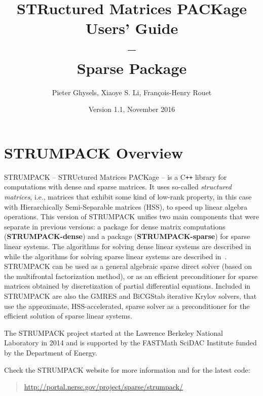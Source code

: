 \documentclass{article}
\title{\vspace{-3\baselineskip}STRuctured Matrices PACKage Users' Guide\\
--\\
Sparse Package}
\author{Pieter Ghysels\footnotemark[1] , Xiaoye S. Li\footnotemark[1] , Fran\c{c}ois-Henry Rouet\footnotemark[1]}
\date{Version 1.1, November 2016}
\begin{document}
\maketitle

\vfill

\tableofcontents


\pagebreak
\section{STRUMPACK Overview}
STRUMPACK -- STRUctured Matrices PACKage -- is a C\texttt{++} library
for computations with dense and sparse matrices. It uses so-called
\emph{structured matrices}, i.e., matrices that exhibit some kind of
low-rank property, in this case with Hierarchically Semi-Separable
matrices (HSS), to speed up linear algebra operations. 
This version of STRUMPACK unifies two main components that were separate in previous versions:
a package for dense matrix computations
(\textbf{STRUMPACK-dense}) and a package (\textbf{STRUMPACK-sparse})
for sparse linear systems. The algorithms for solving dense linear systems are described 
in~\cite{rouet2014distributed} while the algorithms for solving sparse linear systems are described
in~\cite{ghysels2015sparse,ghysels2017sparse}. STRUMPACK can be used as a general
algebraic sparse direct solver (based on the multifrontal
factorization method), or as an efficient preconditioner for sparse
matrices obtained by discretization of partial differential
equations. Included in STRUMPACK are also the GMRES
and BiCGStab iterative Krylov solvers, that use the approximate,
HSS-accelerated, sparse solver as a preconditioner for the efficient
solution of sparse linear systems.

The STRUMPACK project started at the Lawrence Berkeley National
Laboratory in 2014 and is supported by the FASTMath SciDAC Institute
funded by the Department of Energy.

\noindent Check the STRUMPACK website for more information and for the
latest code:
\begin{quote}
  \url{http://portal.nersc.gov/project/sparse/strumpack/}
\end{quote}
\end{document}
